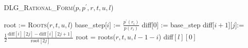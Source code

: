 \documentclass[sigconf]{acmart}
\begin{document}


%
%










\begin{algorithm}
\caption{\textsc{DLG\_Rational\_Form}($p,p^\prime,r,t,u,l$)}
\label{alg:DLG_rational_form}
\begin{algorithmic}
\STATE 	root      := \textsc{Roots}($r,t,u,l$)
\STATE 	base\_step[$i$] := $\frac{p^\prime(r_i)}{p(r_i)}$
\ENDFOR
\STATE  diff[0]   := base\_step
\STATE 			diff[$i+1$][$j$]:=$\frac{1}{2}\frac{\text{diff}[i][2j]-\text{diff}[i][2j+1]}{\text{root}[2j]}$
\STATE 		root = roots($r,t,u,l-1-i$)
\ENDFOR
\ENDFOR
\RETURN diff$[l][0]$
\end{algorithmic}
\end{algorithm}
\end{document}
